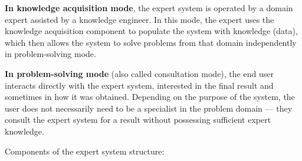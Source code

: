 \documentclass[a4paper,final]{article}
\begin{document}
\textbf{In knowledge acquisition mode}, the expert system is operated by a domain expert assisted by a knowledge engineer. In this mode, the expert uses the knowledge acquisition component to populate the system with knowledge (data), which then allows the system to solve problems from that domain independently in problem-solving mode.

\textbf{In problem-solving mode} (also called consultation mode), the end user interacts directly with the expert system, interested in the final result and sometimes in how it was obtained. Depending on the purpose of the system, the user does not necessarily need to be a specialist in the problem domain --- they consult the expert system for a result without possessing sufficient expert knowledge.

Components of the expert system structure:
\end{document}
